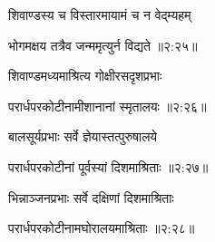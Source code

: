 {\devanagarifont शिवाण्डस्य च विस्तारमायामं च न वेद्म्यहम् \thinspace{\dandab} \dontdisplaylinenum }%
 

{\devanagarifont भोगमक्षय तत्रैव जन्ममृत्युर्न विद्यते {॥२:२५॥} \veg\dontdisplaylinenum }%

{\devanagarifont शिवाण्डमध्यमाश्रित्य गोक्षीरसदृशप्रभाः \thinspace{\dandab} \dontdisplaylinenum }%


{\devanagarifont परार्धपरकोटीनामीशानानां स्मृतालयः {॥२:२६॥} \veg\dontdisplaylinenum }%

{\devanagarifont बालसूर्यप्रभाः सर्वे ज्ञेयास्तत्पुरुषालये \thinspace{\dandab} \dontdisplaylinenum }%


{\devanagarifont परार्धपरकोटीनां पूर्वस्यां दिशमाश्रिताः {॥२:२७॥} \veg\dontdisplaylinenum }%

{\devanagarifont भिन्नाञ्जनप्रभाः सर्वे दक्षिणां दिशमाश्रिताः \thinspace{\dandab} \dontdisplaylinenum }%


{\devanagarifont परार्धपरकोटीनामघोरालयमाश्रिताः {॥२:२८॥} \veg\dontdisplaylinenum }%

